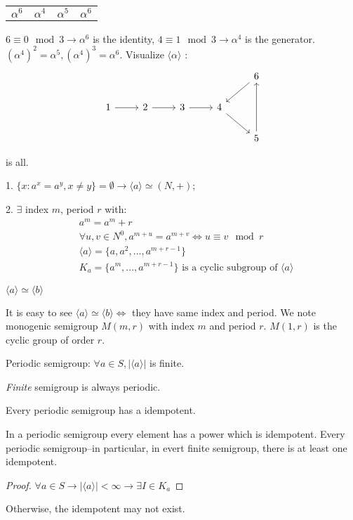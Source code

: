 \begin{Exap}
\begin{center}
\begin{tabular}{c|ccc}
            $\alpha^6$ & $\alpha^4$ & $\alpha^5$ & $\alpha^6$ \\
        \end{tabular}
    \end{center}
    $6\equiv 0 \mod{3} \rightarrow \alpha^6$ is the identity, $4\equiv 1\mod{3}\rightarrow \alpha^4$ is the generator. $(\alpha^4)^2=\alpha^5, (\alpha^4)^3=\alpha^6$.
    Visualize $\langle \alpha \rangle$ :
    \[\begin{tikzcd}
        &&&& 6   
            \arrow[ld]  \\
        1 \arrow[r] &
        2 \arrow[r] & 
        3 \arrow[r] &
        4 \arrow[dr] &  \\
        &&&&  5
            \arrow[uu]
    \end{tikzcd}\]
\end{Exap}

\begin{Them} is all.

    1. $\{x:a^x=a^y,x\neq y\} = \emptyset \rightarrow \langle a\rangle \simeq (N,+)$;

    2. $\exists$ index $m$, period $r$ with:
    \begin{align*}
        &a^m=a^m+r   \\
        &\forall u,v \in N^0, a^{m+u}=a^{m+v} \Leftrightarrow u \equiv v \mod{r}    \\
        &\langle a\rangle =\{a,a^2,...,a^{m+r-1}\}  \\
        &K_a=\{a^m,...,a^{m+r-1}\} \text{ is a cyclic subgroup of }\langle a\rangle
    \end{align*}
\end{Them}

\begin{Rmk}$\langle a\rangle \simeq \langle b\rangle$

    It is easy to see $\langle a\rangle \simeq \langle b\rangle \Leftrightarrow $ they have same index and period.
    We note monogenic semigroup $M(m,r)$ with index $m$ and period $r$.
    $M(1,r)$ is the cyclic group of order $r$.

    Periodic semigroup: $\forall a \in S, |\langle a \rangle|$ is finite.

    \emph{Finite} semigroup is always periodic.
\end{Rmk}

\begin{Prop}Every periodic semigroup has a idempotent.
    
    In a periodic semigroup every element has a power which is idempotent. 
    Every periodic semigroup--in particular, in evert finite semigroup, there is at least one idempotent.
    \begin{proof}
        $\forall a \in S \rightarrow |\langle a\rangle| < \infty\rightarrow \exists I \in K_a$
    \end{proof}
    Otherwise, the idempotent may not exist.
\end{Prop}

